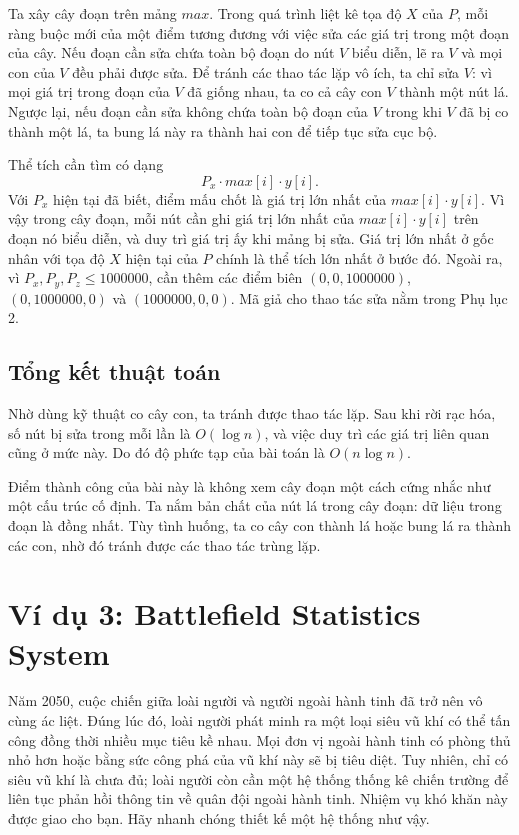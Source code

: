 \documentclass[11pt]{article}
\begin{document}
Ta xây cây đoạn trên mảng $\mathit{max}$. Trong quá trình liệt kê tọa độ $X$
của $P$, mỗi ràng buộc mới của một điểm tương đương với việc sửa các giá trị
trong một đoạn của cây. Nếu đoạn cần sửa chứa toàn bộ đoạn do nút $V$ biểu
diễn, lẽ ra $V$ và mọi con của $V$ đều phải được sửa. Để tránh các thao tác
lặp vô ích, ta chỉ sửa $V$: vì mọi giá trị trong đoạn của $V$ đã giống nhau,
ta co cả cây con $V$ thành một nút lá. Ngược lại, nếu đoạn cần sửa không chứa
toàn bộ đoạn của $V$ trong khi $V$ đã bị co thành một lá, ta bung lá này ra
thành hai con để tiếp tục sửa cục bộ.

Thể tích cần tìm có dạng
\[
  P_x\cdot \mathit{max}[i]\cdot y[i].
\]
Với $P_x$ hiện tại đã biết, điểm mấu chốt là giá trị lớn nhất của
$\mathit{max}[i]\cdot y[i]$. Vì vậy trong cây đoạn, mỗi nút cần ghi giá trị
lớn nhất của $\mathit{max}[i]\cdot y[i]$ trên đoạn nó biểu diễn, và duy trì
giá trị ấy khi mảng bị sửa. Giá trị lớn nhất ở gốc nhân với tọa độ $X$ hiện
tại của $P$ chính là thể tích lớn nhất ở bước đó. Ngoài ra, vì
$P_x,P_y,P_z\le 1000000$, cần thêm các điểm biên
$(0,0,1000000)$, $(0,1000000,0)$ và $(1000000,0,0)$. Mã giả cho thao tác sửa
nằm trong Phụ lục 2.

\subsection*{Tổng kết thuật toán}

Nhờ dùng kỹ thuật co cây con, ta tránh được thao tác lặp. Sau khi rời rạc
hóa, số nút bị sửa trong mỗi lần là $O(\log n)$, và việc duy trì các giá trị
liên quan cũng ở mức này. Do đó độ phức tạp của bài toán là $O(n\log n)$.

Điểm thành công của bài này là không xem cây đoạn một cách cứng nhắc như một
cấu trúc cố định. Ta nắm bản chất của nút lá trong cây đoạn: dữ liệu trong
đoạn là đồng nhất. Tùy tình huống, ta co cây con thành lá hoặc bung lá ra
thành các con, nhờ đó tránh được các thao tác trùng lặp.

\section{Ví dụ 3: Battlefield Statistics System}

Năm 2050, cuộc chiến giữa loài người và người ngoài hành tinh đã trở nên vô
cùng ác liệt. Đúng lúc đó, loài người phát minh ra một loại siêu vũ khí có
thể tấn công đồng thời nhiều mục tiêu kề nhau. Mọi đơn vị ngoài hành tinh có
phòng thủ nhỏ hơn hoặc bằng sức công phá của vũ khí này sẽ bị tiêu diệt. Tuy
nhiên, chỉ có siêu vũ khí là chưa đủ; loài người còn cần một hệ thống thống
kê chiến trường để liên tục phản hồi thông tin về quân đội ngoài hành tinh.
Nhiệm vụ khó khăn này được giao cho bạn. Hãy nhanh chóng thiết kế một hệ thống
như vậy.
\end{document}
